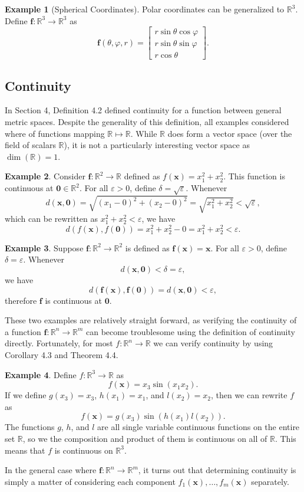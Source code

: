 \documentclass{article}
\newcommand{\R}{\mathbb{R}}
\newcommand{\x}{\mathbf{x}}
\newcommand{\f}{\mathbf{f}}
\newcommand{\ze}{\mathbf{0}}
\theoremstyle{definition}
\newtheorem{example}{Example}[section]
\begin{document}
\begin{example}[Spherical Coordinates]
	Polar coordinates can be generalized to $ \R^3 $. Define $ \f:\R^3\to\R^3 $ as 
	$$ \f(\theta, \varphi, r) =\begin{bmatrix}
		r\sin \theta\cos\varphi\\r\sin \theta\sin\varphi\\ r\cos\theta
	\end{bmatrix}  .$$ 
\end{example}

\subsection{Continuity}
In Section 4, Definition 4.2 defined continuity for a function between general metric spaces. Despite the generality of this definition, all examples considered where of functions mapping $ \R\mapsto\R $. While $ \R $ does form a vector space (over the field of scalars $ \R $), it is not a particularly interesting vector space as $ \dim(\R) = 1$. 
\begin{example}
	Consider $ \f:\R^2\to\R $ defined as $ f(\x)=x_1^2 + x_2^2 $. This function is continuous at $ \ze \in \R^2 $. For all $ \varepsilon > 0 $, define $ \delta = \sqrt{\varepsilon} $. Whenever $$ d(\x, \ze) = \sqrt{(x_1 - 0)^2 + (x_2 - 0)^2} = \sqrt{x_1^2 + x_2^2} < \sqrt{\varepsilon}, $$ which can be rewritten as $ x_1^2 + x_2^2 < \varepsilon$, we have 
	$$d(f(\x),f(\ze)) = x_1^2 + x_2^2 - 0 = x_1^2 + x_2^2 < \varepsilon.$$
\end{example}

\begin{example}
	Suppose $\f:\R^2 \to \R^2 $ is defined as $ \f(\x)=\x $. For all $ \varepsilon>0 $, define $ \delta = \varepsilon $. Whenever 
	$$ d(\x,\ze) < \delta = \varepsilon,$$ we have $$ d(\f(\x), \f(\ze)) = d(\x,\ze) < \varepsilon,$$ therefore $ \f $ is continuous at $ \ze $. 
\end{example}
These two examples are relatively straight forward, as verifying the continuity of a function $ \f:\R^n\to\R^m $ can become troublesome using the definition of continuity directly. Fortunately, for most $ f:\R^n\to\R $ we can verify continuity by using Corollary 4.3 and Theorem 4.4.
\begin{example}
	Define $ f:\R^3\to\R $ as $$f(\x)=x_3\sin(x_1x_2) .$$
	If we define $ g(x_3)=x_3 $, $ h(x_1)=x_1 $, and $ l(x_2)=x_2 $, then we can rewrite $ f $ as $$f(\x)=g(x_3)\sin(h(x_1)l(x_2)) .$$ The functions $ g $, $ h $, and $ l $ are all single variable continuous functions on the entire set $ \R $, so we the composition and product of them is continuous on all of $ \R $. This means that $ f $ is continuous on $ \R^3 $.  
\end{example}
	In the general case where $ \f:\R^n\to\R^m $, it turns out that determining continuity is simply a matter of considering each component $ f_1(\x),\ldots,f_m(\x) $ separately. 
	
\end{document}
